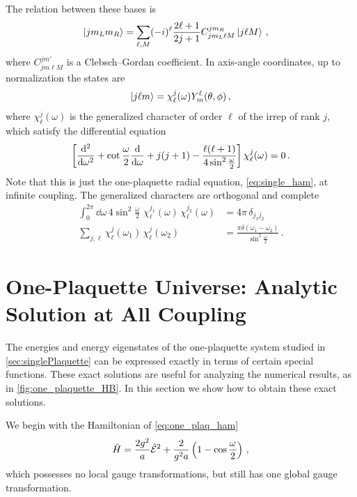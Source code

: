 \documentclass[reprint,superscriptaddress,pra,nofootinbib,preprintnumbers,floatfix]{revtex4-1}
\begin{document}
The relation between these bases is~\cite{khersonskii1988quantum}
%
\begin{align}
\label{eq:Uexp}
    \ket{j{m_L}{m_R}} & = \sum_{\ell,M}(-i)^\ell \frac{2 \ell+1}{2j+1} C^{j{m_R}}_{j{m_L}\ell M}
    \ket{j \ell M}
    \,,
\end{align}
%
where $C^{jm'}_{jm\ell M}$ is a Clebsch--Gordan coefficient. In axis-angle coordinates, up to normalization the states are
%
\begin{align}
    \ket{j \ell m} = \chi^j_\ell(\omega)Y^{\ell}_m(\theta, \phi)
    \,,
\end{align}
%
where $\chi^j_\ell(\omega)$ is the generalized character of order $\ell$ of the irrep of rank $j$, which satisfy the differential equation
%
\begin{align}
\label{eq:diffEq_chi}
    \left[\frac{{\rm d}^2}{{\rm d} \omega^2}+\cot\frac{\omega}{2} \frac{\rm d}{{\rm d} \omega}+j(j+1) - \frac{\ell(\ell+1)}{4\sin^2\frac{\omega}{2}}\right]\chi^j_\ell(\omega) = 0
    \,.
\end{align}
%
Note that this is just the one-plaquette radial equation, \cref{eq:single_ham}, at infinite coupling. %
The generalized characters are orthogonal and complete
%
\begin{align}
    \int_0^{2\pi}\! \dd \omega \, 4 \sin^2\frac{\omega}{2} \,\,\chi^{j_1}_\ell(\omega)\, \chi^{j_2}_\ell(\omega) &= 4 \pi \,\delta_{j_1 j_2}\nonumber\\
    \sum_{j,\ell} \chi^{j}_\ell(\omega_1)\, \chi^{j}_\ell(\omega_2) &= \frac{\pi \delta(\omega_1 - \omega_2)}{\sin^2\frac{\omega}{2}}\,.
\end{align}

\section{One-Plaquette Universe: Analytic Solution at All Coupling}
\label{app:analytic_solution}
The energies and energy eigenstates of the one-plaquette system studied in \cref{sec:singlePlaquette} can be expressed exactly in terms of certain special functions. 
%
These exact solutions are useful for analyzing the numerical results, as in \cref{fig:one_plaquette_HB}. In this section we show how to obtain these exact solutions.

We begin with the Hamiltonian of \cref{eq:one_plaq_ham}
%
\begin{align}
        \hat H = \frac{2g^2}{a}\hat{\cal E}^2 + \frac{2}{g^2 a}\left(1 - \cos\frac{\omega}{2}\right)
    \,,
\end{align}
%
which possesses no local gauge transformations, but still has one global gauge transformation.
\end{document}
